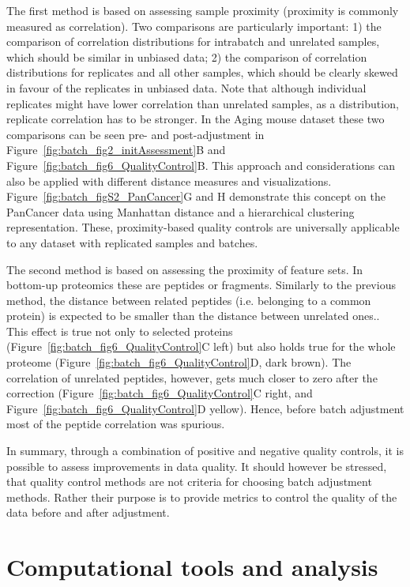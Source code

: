 \documentclass[num-refs]{wiley-article}
\begin{document}
The first method is based on assessing sample proximity (proximity is commonly measured as correlation). 
Two comparisons are particularly important: 1) the comparison of correlation distributions for intrabatch and unrelated samples, which should be similar in unbiased data; 2) the comparison of correlation distributions for replicates and all other samples, which should be clearly skewed in favour of the replicates in unbiased data. Note that although individual replicates might have lower correlation than unrelated samples, as a distribution, replicate correlation has to be stronger. In the Aging mouse dataset these two comparisons can be seen pre- and post-adjustment in Figure~\ref{fig:batch_fig2_initAssessment}B and Figure~\ref{fig:batch_fig6_QualityControl}B. This approach and considerations can also be applied with different distance measures and visualizations. Figure~\ref{fig:batch_figS2_PanCancer}G and H demonstrate this concept on the PanCancer data using Manhattan distance and a hierarchical clustering representation. These, proximity-based quality controls are universally  applicable to any dataset with replicated samples and batches.

The second method is based on assessing the proximity of feature sets. In bottom-up proteomics these are peptides or fragments. Similarly to the previous method, the distance between related peptides (i.e. belonging to a common protein) is expected to be smaller than the distance between unrelated ones.. This effect is true not only to selected proteins (Figure~\ref{fig:batch_fig6_QualityControl}C left) but also holds true for the whole proteome (Figure~\ref{fig:batch_fig6_QualityControl}D, dark brown). The correlation of unrelated peptides, however, gets much closer to zero after the correction (Figure~\ref{fig:batch_fig6_QualityControl}C right, and Figure~\ref{fig:batch_fig6_QualityControl}D yellow). Hence, before batch adjustment most of the peptide correlation was spurious.

In summary, through a combination of positive and negative quality controls, it is possible to assess improvements in data quality. It should however be stressed, that quality control methods are not criteria for choosing batch adjustment methods. Rather their purpose is to provide metrics to control the quality of the data before and after adjustment.

\section{Computational tools and analysis}
\end{document}
